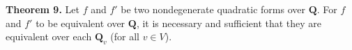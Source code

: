 \textbf{Theorem 9.} Let $f$ and $f'$ be two nondegenerate quadratic forms over $\mathbf{Q}$. For $f$ and $f'$ to be equivalent over $\mathbf{Q}$, it is necessary and sufficient that they are equivalent over each $\mathbf{Q}_v$ (for all $v \in V$).
